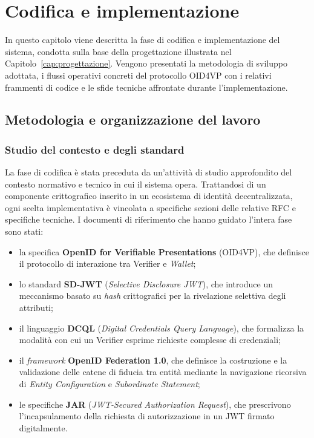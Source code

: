 \chapter{Codifica e implementazione}
\label{cap:codifica}
In questo capitolo viene descritta la fase di codifica e implementazione del sistema, condotta sulla base della progettazione illustrata nel Capitolo~\ref{cap:progettazione}. Vengono presentati la metodologia di sviluppo adottata, i flussi operativi concreti del protocollo OID4VP con i relativi frammenti di codice e le sfide tecniche affrontate durante l'implementazione.

\section{Metodologia e organizzazione del lavoro}

\subsection{Studio del contesto e degli standard}
La fase di codifica è stata preceduta da un'attività di studio approfondito del contesto normativo e tecnico in cui il sistema opera. Trattandosi di un componente crittografico inserito in un ecosistema di identità decentralizzata, ogni scelta implementativa è vincolata a specifiche sezioni delle relative RFC e specifiche tecniche. I documenti di riferimento che hanno guidato l'intera fase sono stati:

\begin{itemize}
    \item la specifica \textbf{OpenID for Verifiable Presentations} (OID4VP), che definisce il protocollo di interazione tra Verifier e \textit{Wallet};
    \item lo standard \textbf{SD-JWT} (\textit{Selective Disclosure JWT}), che introduce un meccanismo basato su \textit{hash} crittografici per la rivelazione selettiva degli attributi;
    \item il linguaggio \textbf{DCQL} (\textit{Digital Credentials Query Language}), che formalizza la modalità con cui un Verifier esprime richieste complesse di credenziali;
    \item il \textit{framework} \textbf{OpenID Federation 1.0}, che definisce la costruzione e la validazione delle catene di fiducia tra entità mediante la navigazione ricorsiva di \textit{Entity Configuration} e \textit{Subordinate Statement};
    \item le specifiche \textbf{JAR\glsfirstoccur{}} (\textit{JWT-Secured Authorization Request}), che prescrivono l'incapsulamento della richiesta di autorizzazione in un JWT firmato digitalmente.
\end{itemize}


